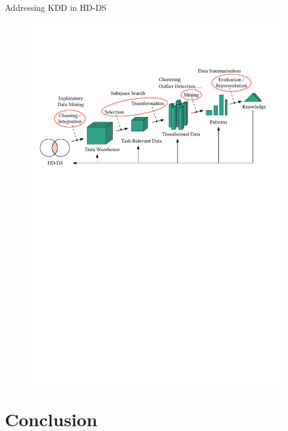 \documentclass[16pt,usenames,dvipsnames, notheorems]{beamer}
\theoremstyle{definition}
\theoremstyle{example}
\theoremstyle{plain}
\begin{document}
\begin{frame}{Addressing KDD in HD-DS}
\begin{figure}
\begin{overprint}
		 \includegraphics[width=\linewidth]{figures/kdd_bis_3-compressed.pdf}
	\end{overprint}
\end{figure}

\end{frame}

\section{Conclusion}
\end{document}
